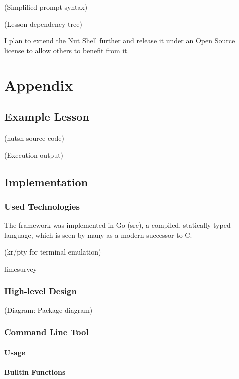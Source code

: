 \documentclass[a4paper,twoside,abstract=on,cleardoublepage=empty,numbers=noenddot,toc=bib]{scrreprt}
\begin{document}
    (Simplified prompt syntax)

    (Lesson dependency tree)

I plan to extend the Nut Shell further and release it under an Open Source license to allow others to benefit from it.

\part*{Appendix}

\appendix

\chapter{Example Lesson}

(nutsh source code)

(Execution output)

\chapter{Implementation}

\section{Used Technologies}

The framework was implemented in Go (src), a compiled, statically typed language, which is seen by many as a modern successor to C.

(kr/pty for terminal emulation)

    limesurvey

\section{High-level Design}

(Diagram: Package diagram)

\section{Command Line Tool}

\subsection{Usage}

\subsection{Builtin Functions}
\end{document}
